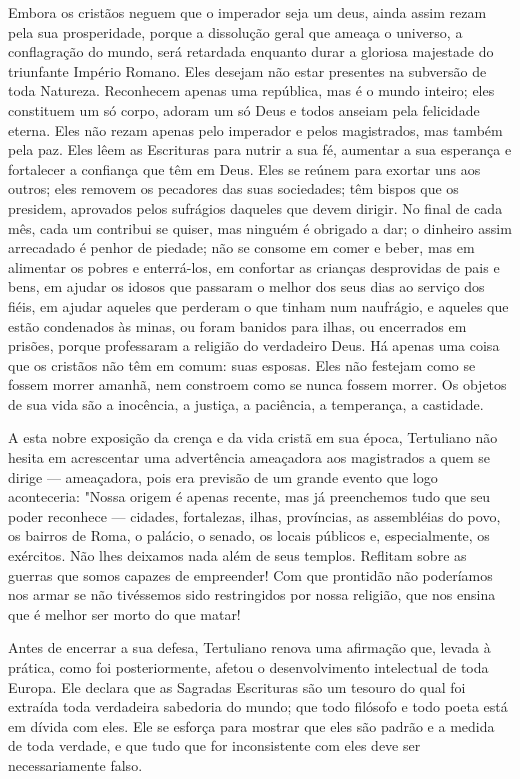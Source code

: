 \documentclass[11pt,a5paper,twoside,openany]{book}
\begin{document}
Embora os cristãos neguem que o imperador seja um deus, ainda assim rezam pela sua prosperidade, porque a dissolução geral que ameaça o universo, a conflagração do mundo, será retardada enquanto durar a gloriosa majestade do triunfante Império Romano. Eles desejam não estar presentes na subversão de toda Natureza. Reconhecem apenas uma república, mas é o mundo inteiro; eles constituem um só corpo, adoram um só Deus e todos anseiam pela felicidade eterna. Eles não rezam apenas pelo imperador e pelos magistrados, mas também pela paz. Eles lêem as Escrituras para nutrir a sua fé, aumentar a sua esperança e fortalecer a confiança que têm em Deus. Eles se reúnem para exortar uns aos outros; eles removem os pecadores das suas sociedades; têm bispos que os presidem, aprovados pelos sufrágios daqueles que devem dirigir. No final de cada mês, cada um contribui se quiser, mas ninguém é obrigado a dar; o dinheiro assim arrecadado é penhor de piedade; não se consome em comer e beber, mas em alimentar os pobres e enterrá-los, em confortar as crianças desprovidas de pais e bens, em ajudar os idosos que passaram o melhor dos seus dias ao serviço dos fiéis, em ajudar aqueles que perderam o que tinham num naufrágio, e aqueles que estão condenados às minas, ou foram banidos para ilhas, ou encerrados em prisões, porque professaram a religião do verdadeiro Deus. Há apenas uma coisa que os cristãos não têm em comum: suas esposas. Eles não festejam como se fossem morrer amanhã, nem constroem como se nunca fossem morrer. Os objetos de sua vida são a inocência, a justiça, a paciência, a temperança, a castidade.

A esta nobre exposição da crença e da vida cristã em sua época, Tertuliano não hesita em acrescentar uma advertência ameaçadora aos magistrados a quem se dirige — ameaçadora, pois era previsão de um grande evento que logo aconteceria: "Nossa origem é apenas recente, mas já preenchemos tudo que seu poder reconhece — cidades, fortalezas, ilhas, províncias, as assembléias do povo, os bairros de Roma, o palácio, o senado, os locais públicos e, especialmente, os exércitos. Não lhes deixamos nada além de seus templos. Reflitam sobre as guerras que somos capazes de empreender! Com que prontidão não poderíamos nos armar se não tivéssemos sido restringidos por nossa religião, que nos ensina que é melhor ser morto do que matar!

Antes de encerrar a sua defesa, Tertuliano renova uma afirmação que, levada à prática, como foi posteriormente, afetou o desenvolvimento intelectual de toda Europa. Ele declara que as Sagradas Escrituras são um tesouro do qual foi extraída toda verdadeira sabedoria do mundo; que todo filósofo e todo poeta está em dívida com eles. Ele se esforça para mostrar que eles são padrão e a medida de toda verdade, e que tudo que for inconsistente com eles deve ser necessariamente falso.
\end{document}

